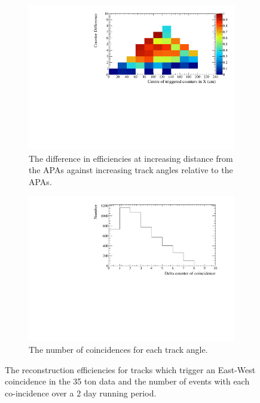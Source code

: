 \begin{figure}[h!]
  \begin{subfigure}{0.45\textwidth}
    \centering
    \includegraphics[width=\textwidth]{TwoDimensional_50cm}
    \caption{The difference in efficiencies at increasing distance from the APAs against increasing track angles relative to the APAs.}
    \label{fig:TwoDimCanvas}
  \end{subfigure}
  \hspace{0.08\textwidth}
  \begin{subfigure}{0.45\textwidth}
    \centering
    \includegraphics[width=\textwidth]{CounterDiffCan}
    \caption{The number of coincidences for each track angle.}
    \label{fig:CounterDiffFreq}
  \end{subfigure}
  \caption[Reconstruction efficiencies of through going tracks in the 35 ton data]{The reconstruction efficiencies for tracks which trigger an East-West coincidence in the 35 ton data and the number of events with each co-incidence over a 2 day running period.}
  \label{fig:DataRecoEffics}
\end{figure}
    
